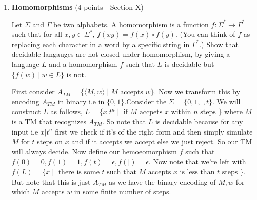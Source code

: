 \documentclass[11pt]{article}
\begin{document}
\begin{enumerate}
\begin{answer}
     $M_{1}:$ on input $x$ does,
     \begin{enumerate}
         \item If $x = w$ then we simulate $M$ on $w$, and on $M$ accepting $w$ we jump to a new state $q$ and accept.
         \item If $x \ne w$ then we just reject.
     \end{enumerate}

     So essentially we have $q$ is a useful state of $M$ if and only if $\langle M, w \rangle \in A_{TM}$. Using this we construct $S$ as follows,

     S: on input $\langle M, w \rangle$
     \begin{enumerate}
         \item Construct $M_{1}$
         \item Run $R$ on $\langle M_{1}, q\rangle$ (where $q$ is the new state we added for $w$)
         \item If $R$ accepts it implies that $q$ is a useless state of $M_{1}$ and hence we reject
         \item If $R$ rejects we accept.
     \end{enumerate}
     So here we have a decider for $A_{TM}$ a contradiction.


\end{answer}

 \item \textbf{Homomorphisms} (4 points - Section X)
 
 Let $\Sigma$ and $\Gamma$ be two alphabets. A homomorphism is a function $f: \Sigma^* \rightarrow \Gamma^*$ such that for all $x, y \in \Sigma^*$, $f(xy) = f(x) \circ f(y)$.  (You can think of $f$ as replacing each character in a word by a specific string in $\Gamma^*$.)  Show that decidable langauges are not closed under homomorphism, by giving a language $L$ and a homomorphism $f$ such that $L$ is decidable but $\{f(w) ~|~ w \in L\}$ is not.

\begin{answer}
    First consider $A_{TM} = \{\langle M, w \rangle \mid M \text{ accepts } w\}$. Now we transform this by encoding $A_{TM}$ in binary i.e in $\{0, 1\}$.Consider the $\Sigma = \{0, 1, |, t\}$. We will construct $L$ as follows, $L = \{x | t^{n} \mid \text{ if $M$ accpets $x$ within $n$ steps }\}$ where $M$ is a TM that recognizes $A_{TM}$. So note that $L$ is decidable because for any input i.e $x | t^{n}$ first we check if it's of the right form and then simply simulate $M$ for $t$ steps on $x$ and if it accepts we accept else we just reject. So our TM will always decide. Now define our hemoeomorphism $f$ such that $f(0) = 0, f(1) = 1, f(t) = \epsilon, f(|) = \epsilon$. Now note that we're left with $f(L) = \{x \mid \text{ there is some $t$ such that $M$ accepts $x$ is less than $t$ steps }\}$. But note that this is just $A_{TM}$ as we have the binary encoding of $M, w$ for which $M$ accepts $w$ in some finite number of steps.
\end{answer}


\end{enumerate}
\end{document}

